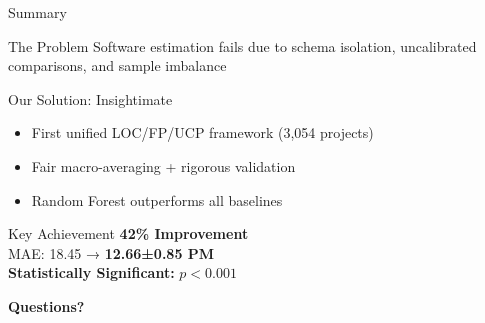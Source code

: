 \documentclass[aspectratio=169]{beamer}
\begin{document}
\begin{frame}{Summary}
\begin{block}{The Problem}
Software estimation fails due to schema isolation, uncalibrated comparisons, and sample imbalance
\end{block}

\vspace{0.3cm}
\begin{block}{Our Solution: Insightimate}
\begin{itemize}
    \item First unified LOC/FP/UCP framework (3,054 projects)
    \item Fair macro-averaging + rigorous validation
    \item Random Forest outperforms all baselines
\end{itemize}
\end{block}

\vspace{0.3cm}
\begin{exampleblock}{\Large Key Achievement}
\textbf{42\% Improvement}\\
MAE: 18.45 → \textbf{12.66±0.85 PM}\\
\textbf{Statistically Significant:} $p < 0.001$
\end{exampleblock}

\vspace{0.3cm}
\begin{center}
\Large \textbf{Questions?}
\end{center}
\end{frame}
\end{document}
